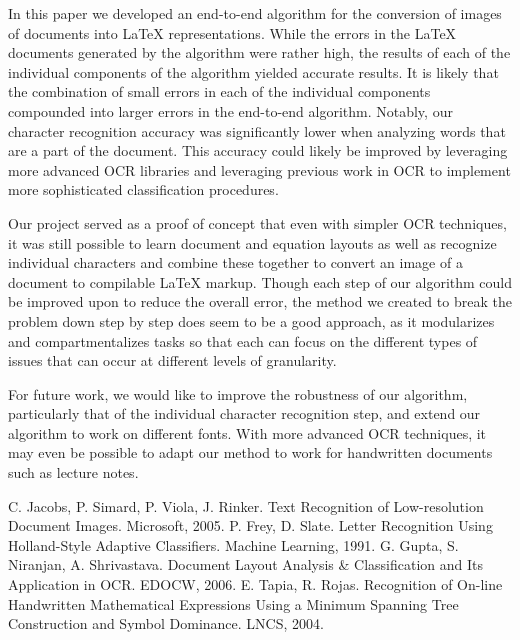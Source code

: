 \documentclass[10pt]{IEEEtran}
\newcommand{\latex}{\LaTeX\xspace}
\begin{document}
In this paper we developed an end-to-end algorithm for the conversion of images of documents into \latex representations. While the errors in the \latex documents generated by the algorithm were rather high, the results of each of the individual components of the algorithm yielded accurate results. It is likely that the combination of small errors in each of the individual components compounded into larger errors in the end-to-end algorithm. Notably, our character recognition accuracy was significantly lower when analyzing words that are a part of the document. This accuracy could likely be improved by leveraging more advanced OCR libraries and leveraging previous work in OCR to implement more sophisticated classification procedures. 

Our project served as a proof of concept that even with simpler OCR techniques, it was still possible to learn document and equation layouts as well as recognize individual characters and combine these together to convert an image of a document to compilable \latex markup. Though each step of our algorithm could be improved upon to reduce the overall error, the method we created to break the problem down step by step does seem to be a good approach, as it modularizes and compartmentalizes tasks so that each can focus on the different types of issues that can occur at different levels of granularity. 

For future work, we would like to improve the robustness of our algorithm, particularly that of the individual character recognition step, and extend our algorithm to work on different fonts. With more advanced OCR techniques, it may even be possible to adapt our method to work for handwritten documents such as lecture notes.

\begin{thebibliography}{1}
 C. Jacobs, P. Simard, P. Viola, J. Rinker. Text Recognition of Low-resolution Document Images. Microsoft, 2005.
 P. Frey, D. Slate. Letter Recognition Using Holland-Style Adaptive Classifiers. Machine Learning, 1991. 
 G. Gupta, S. Niranjan, A. Shrivastava. Document Layout Analysis \& Classification and Its Application in OCR. EDOCW, 2006. 
 E. Tapia, R. Rojas. Recognition of On-line Handwritten Mathematical Expressions Using a Minimum Spanning Tree Construction and Symbol Dominance. LNCS, 2004.
\end{thebibliography}

\end{document}
